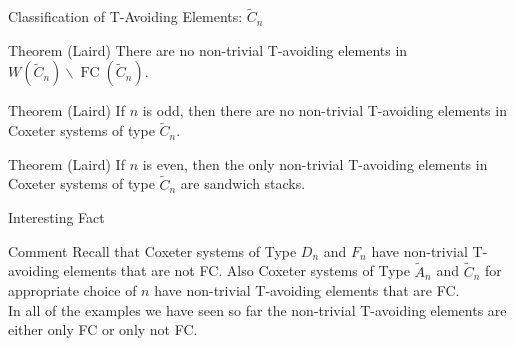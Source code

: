 \documentclass{beamer}
\DeclareMathOperator{\FC}{FC}
\newcommand{\C}{\widetilde{C}}
\begin{document}


\begin{frame}{Classification of T-Avoiding Elements: $\C_n$}

\begin{block}{Theorem (Laird)}
	There are no non-trivial T-avoiding elements in $W(\C_n)\backslash\FC(\C_n)$.
\end{block}
\pause
\begin{block}{Theorem (Laird)}
	If $n$ is odd, then there are no non-trivial T-avoiding elements in Coxeter systems of type $\C_n$.
\end{block}
\pause
\begin{block}{Theorem (Laird)}
	If $n$ is even, then the only non-trivial T-avoiding elements in Coxeter systems of type $\C_n$ are sandwich stacks.
\end{block}
	
\end{frame}




\begin{frame}{Interesting Fact}
\begin{block}{Comment}
Recall that Coxeter systems of Type $D_n$ and $F_n$ have non-trivial T-avoiding elements that are not FC. Also Coxeter systems of Type $\widetilde{A}_n$ and $\C_n$ for appropriate choice of $n$ have non-trivial T-avoiding elements that are FC. \\
\vspace{1em}
In all of the examples we have seen so far the non-trivial T-avoiding elements are either only FC or only not FC.	
\end{block}

	
\end{frame}
\end{document}
